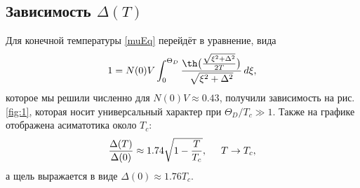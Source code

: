 \subsection*{Зависимость \texorpdfstring{$\Delta(T)$}{Delta(T)}}

Для конечной температуры \eqref{muEq} перейдёт в уравнение, вида
\begin{equation*}
	1 = N(0) V \int_{0}^{\Theta_D} \frac{\th\big(\frac{\sqrt{\xi^2 + \Delta^2}}{2 T}\big)}{\sqrt{\xi^2 + \Delta^2}} \d \xi,
\end{equation*}
которое мы решили численно для $N(0) V \approx 0.43$, получили  зависимость на рис. \ref{fig:1}, которая носит универсальный характер при $\Theta_D/T_c \gg 1$. Также на графике отображена асиматотика около $T_c$:
\begin{equation*}
	\frac{\Delta(T)}{\Delta(0)} \approx 1.74 \sqrt{1 - \frac{T}{T_c}},
	\hspace{5 mm} 
	T \to T_c,
\end{equation*}
а щель выражается в виде $\Delta(0) \approx 1.76 T_c$. 